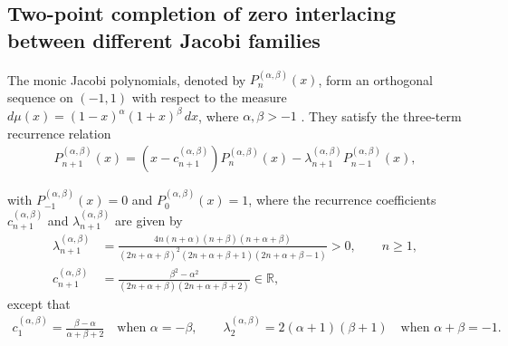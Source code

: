 \documentclass[final,3p,times,12pt]{elsarticle}
\numberwithin{equation}{section}  %
\begin{document}
	\subsection{Two-point completion of zero interlacing between different Jacobi families}\label{Jacobi polynomials}
	
	The monic Jacobi polynomials, denoted by $P_n^{(\alpha, \beta)}(x)$, form an orthogonal sequence on $(-1, 1)$ with respect to the measure $d\mu(x) = (1 - x)^\alpha (1 + x)^\beta \, dx$, where  $\alpha, \beta > -1$ \cite{Chiharabook}. They satisfy the three-term recurrence relation
	\begin{align}\label{TTRR-Monic-Jacobi}
		P_{n+1}^{(\alpha, \beta)}(x) = (x - c^{(\alpha, \beta)}_{n+1}) P_n^{(\alpha, \beta)}(x) - \lambda^{(\alpha, \beta)}_{n+1} P_{n-1}^{(\alpha, \beta)}(x),
	\end{align}
	
	with $P_{-1}^{(\alpha, \beta)}(x) = 0$ and $P_0^{(\alpha, \beta)}(x) = 1$, where the recurrence  coefficients $c^{(\alpha, \beta)}_{n+1}$ and $\lambda^{(\alpha, \beta)}_{n+1}$ are given by
	\begin{align}
		\nonumber \lambda^{(\alpha, \beta)}_{n+1} &= \frac{4n(n + \alpha)(n + \beta)(n + \alpha + \beta)}{(2n + \alpha + \beta)^2 (2n + \alpha + \beta + 1)(2n + \alpha + \beta - 1)}>0, \qquad n\geq1,\\ c^{(\alpha, \beta)}_{n+1}& = \frac{\beta^2 - \alpha^2}{(2n + \alpha + \beta)(2n + \alpha + \beta + 2)}\in \mathbb{R},
	\end{align}
    	except that
	\begin{align*}
	c_1^{(\alpha,\beta)}
			=
			\frac{\beta-\alpha}{\alpha+\beta+2}
			\quad\text{when }\alpha=-\beta,
			\qquad
			\lambda_2^{(\alpha,\beta)}
			=
			2(\alpha+1)(\beta+1)
			\quad\text{when }\alpha+\beta=-1.
	\end{align*}

 
    
\end{document}
